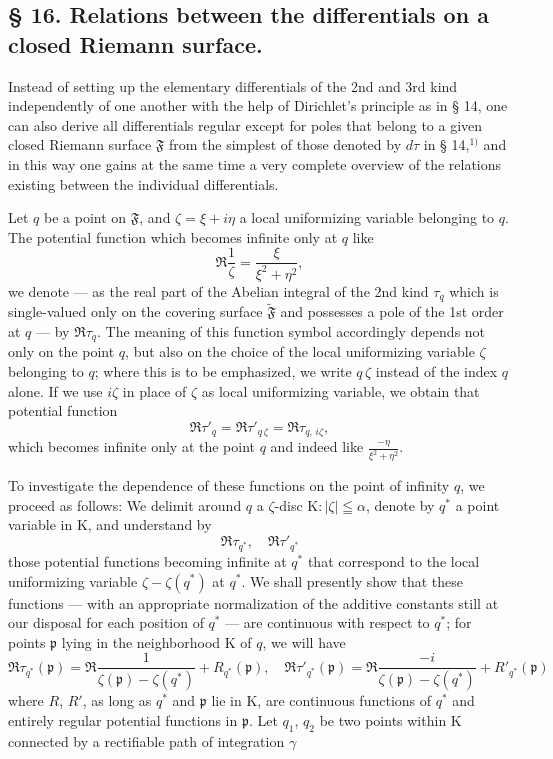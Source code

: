 \documentclass{article}
\begin{document}

\subsection*{§ 16. Relations between the differentials on a closed Riemann surface.}

Instead of setting up the elementary differentials of the 2nd and 3rd kind independently of one another with the help of Dirichlet's principle as in § 14, one can also derive all differentials regular except for poles that belong to a given closed Riemann surface $\mathfrak{F}$ from the simplest of those denoted by $d\tau$ in § 14,${}^{1)}$ and in this way one gains at the same time a very complete overview of the relations existing between the individual differentials.

Let $q$ be a point on $\mathfrak{F}$, and $\zeta = \xi + i\eta$ a local uniformizing variable belonging to $q$. The potential function which becomes infinite only at $q$ like
\[ \Re \frac{1}{\zeta} = \frac{\xi}{\xi^2 + \eta^2}, \]
we denote --- as the real part of the Abelian integral of the 2nd kind $\tau_q$ which is single-valued only on the covering surface $\tilde{\mathfrak{F}}$ and possesses a pole of the 1st order at $q$ --- by $\Re\tau_q$. The meaning of this function symbol accordingly depends not only on the point $q$, but also on the choice of the local uniformizing variable $\zeta$ belonging to $q$; where this is to be emphasized, we write $q\,\zeta$ instead of the index $q$ alone. If we use $i\zeta$ in place of $\zeta$ as local uniformizing variable, we obtain that potential function
\[ \Re\tau'_q = \Re\tau'_{q\,\zeta} = \Re\tau_{q,\,i\zeta}, \]
which becomes infinite only at the point $q$ and indeed like $\frac{-\eta}{\xi^2 + \eta^2}$.

To investigate the dependence of these functions on the point of infinity $q$, we proceed as follows: We delimit around $q$ a $\zeta$-disc $\mathrm{K}\colon |\zeta| \leqq \alpha$, denote by $q^*$ a point variable in $\mathrm{K}$, and understand by
\[ \Re\tau_{q^*}, \quad \Re\tau'_{q^*} \]
those potential functions becoming infinite at $q^*$ that correspond to the local uniformizing variable $\zeta - \zeta(q^*)$ at $q^*$. We shall presently show that these functions --- with an appropriate normalization of the additive constants still at our disposal for each position of $q^*$ --- are continuous with respect to $q^*$; for points $\mathfrak{p}$ lying in the neighborhood $\mathrm{K}$ of $q$, we will have
\[ \Re\tau_{q^*}(\mathfrak{p}) = \Re \frac{1}{\zeta(\mathfrak{p}) - \zeta(q^*)} + R_{q^*}(\mathfrak{p}), \quad \Re\tau'_{q^*}(\mathfrak{p}) = \Re \frac{-i}{\zeta(\mathfrak{p}) - \zeta(q^*)} + R'_{q^*}(\mathfrak{p}) \tag{34} \]
where $R$, $R'$, as long as $q^*$ and $\mathfrak{p}$ lie in $\mathrm{K}$, are continuous functions of $q^*$ and entirely regular potential functions in $\mathfrak{p}$. Let $q_1$, $q_2$ be two points within $\mathrm{K}$ connected by a rectifiable path of integration $\gamma$
\end{document}
